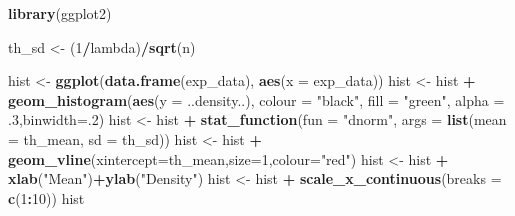\documentclass[]{article}
\newenvironment{Shaded}{\begin{snugshade}}{\end{snugshade}}
\newcommand{\DataTypeTok}[1]{\textcolor[rgb]{0.13,0.29,0.53}{#1}}
\newcommand{\DecValTok}[1]{\textcolor[rgb]{0.00,0.00,0.81}{#1}}
\newcommand{\FloatTok}[1]{\textcolor[rgb]{0.00,0.00,0.81}{#1}}
\newcommand{\KeywordTok}[1]{\textcolor[rgb]{0.13,0.29,0.53}{\textbf{#1}}}
\newcommand{\NormalTok}[1]{#1}
\newcommand{\OperatorTok}[1]{\textcolor[rgb]{0.81,0.36,0.00}{\textbf{#1}}}
\newcommand{\StringTok}[1]{\textcolor[rgb]{0.31,0.60,0.02}{#1}}
\begin{document}
\begin{Shaded}
\begin{Highlighting}[]
\KeywordTok{library}\NormalTok{(ggplot2)}

\NormalTok{th_sd   <-}\StringTok{ }\NormalTok{(}\DecValTok{1}\OperatorTok{/}\NormalTok{lambda)}\OperatorTok{/}\KeywordTok{sqrt}\NormalTok{(n)}

\NormalTok{hist   <-}\StringTok{ }\KeywordTok{ggplot}\NormalTok{(}\KeywordTok{data.frame}\NormalTok{(exp_data), }\KeywordTok{aes}\NormalTok{(}\DataTypeTok{x =}\NormalTok{ exp_data)) }
\NormalTok{hist   <-}\StringTok{ }\NormalTok{hist }\OperatorTok{+}\StringTok{ }\KeywordTok{geom_histogram}\NormalTok{(}\KeywordTok{aes}\NormalTok{(}\DataTypeTok{y =}\NormalTok{ ..density..), }\DataTypeTok{colour =} \StringTok{"black"}\NormalTok{, }\DataTypeTok{fill =} \StringTok{"green"}\NormalTok{, }\DataTypeTok{alpha =} \FloatTok{.3}\NormalTok{,}\DataTypeTok{binwidth=}\NormalTok{.}\DecValTok{2}\NormalTok{)}
\NormalTok{hist   <-}\StringTok{ }\NormalTok{hist }\OperatorTok{+}\StringTok{ }\KeywordTok{stat_function}\NormalTok{(}\DataTypeTok{fun =} \StringTok{"dnorm"}\NormalTok{, }\DataTypeTok{args =} \KeywordTok{list}\NormalTok{(}\DataTypeTok{mean =}\NormalTok{ th_mean, }\DataTypeTok{sd =}\NormalTok{ th_sd))}
\NormalTok{hist   <-}\StringTok{ }\NormalTok{hist }\OperatorTok{+}\StringTok{ }\KeywordTok{geom_vline}\NormalTok{(}\DataTypeTok{xintercept=}\NormalTok{th_mean,}\DataTypeTok{size=}\DecValTok{1}\NormalTok{,}\DataTypeTok{colour=}\StringTok{"red"}\NormalTok{)}
\NormalTok{hist   <-}\StringTok{ }\NormalTok{hist }\OperatorTok{+}\StringTok{ }\KeywordTok{xlab}\NormalTok{(}\StringTok{"Mean"}\NormalTok{)}\OperatorTok{+}\KeywordTok{ylab}\NormalTok{(}\StringTok{"Density"}\NormalTok{)}
\NormalTok{hist   <-}\StringTok{ }\NormalTok{hist }\OperatorTok{+}\StringTok{ }\KeywordTok{scale_x_continuous}\NormalTok{(}\DataTypeTok{breaks =} \KeywordTok{c}\NormalTok{(}\DecValTok{1}\OperatorTok{:}\DecValTok{10}\NormalTok{))}
\NormalTok{hist}
\end{Highlighting}
\end{Shaded}
\end{document}
